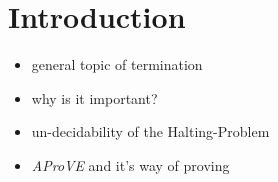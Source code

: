 \chapter{Introduction}

\begin{itemize}
	\item general topic of termination
	\item why is it important?
	\item un-decidability of the Halting-Problem
	\item \emph{AProVE} and it's way of proving
\end{itemize}
